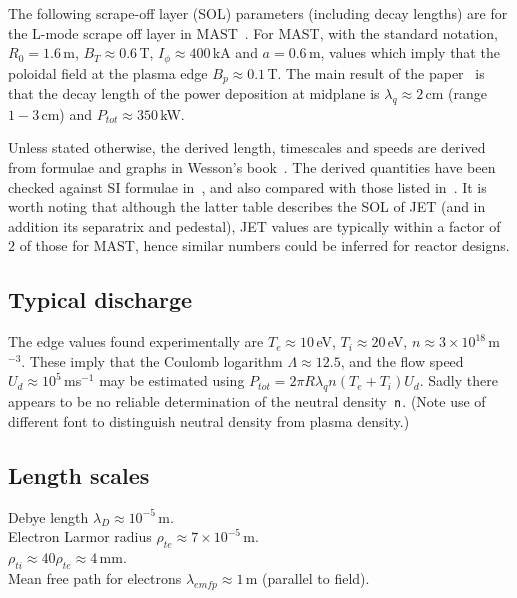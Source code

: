 The following scrape-off layer (SOL) parameters (including decay lengths) are for the
L-mode scrape off layer in MAST~\cite{Mi13Expe}.
For MAST,  with the standard notation,
$R_0=1.6$\,m, $B_T \approx 0.6$\,T, $I_\phi \approx 400$\,kA and
$a=0.6$\,m, values which imply that the poloidal field at the
plasma edge $B_p \approx 0.1$\,T.
The main result of the paper~\cite{Mi13Expe} is that the decay length of the power
deposition at midplane is $\lambda_q \approx 2$\,cm (range $1-3$\,cm)
and $P_{tot} \approx 350$\,kW.

Unless stated otherwise, the derived length, timescales and speeds are derived from
formulae and graphs in Wesson's book~\cite[Chap 10]{wesson}.
The derived quantities have been checked against SI formulae
in~\cite[Table 2.2]{miyamoto}, and also compared with those
listed in~\cite[Appendix]{Xu10Inte}. It is worth noting that although
the latter table describes the SOL of JET (and in addition its separatrix and pedestal),
JET values are typically within a factor of~$2$ of those for MAST, hence similar
numbers could be inferred for reactor designs.

\subsection{Typical discharge}

The edge values found experimentally are 
$T_e \approx 10$\,eV, $T_i \approx 20$\,eV, $n \approx 3 \times 10^{18}$\,m$^{-3}$.
These imply that the Coulomb logarithm $\Lambda \approx 12.5$, and
the flow speed~$U_d \approx 10^5$\,ms$^{-1}$ may be estimated using
$P_{tot}= 2 \pi R \lambda_q n (T_e+T_i) U_d$.
Sadly there appears to be no reliable determination of the neutral density~${\sf n}$.
(Note use of different font to distinguish neutral density from plasma density.)

\subsection{Length scales}

Debye length $\lambda_D \approx 10^{-5}$\,m. \\
Electron Larmor radius $\rho_{te} \approx 7 \times 10^{-5}$\,m. \\
$\rho_{ti} \approx 40 \rho_{te} \approx 4$\,mm. \\
Mean free path for electrons $\lambda_{emfp} \approx 1$\,m (parallel to field).

